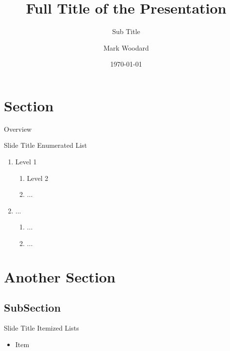 \usepackage[english] {babel}

\usepackage{amsmath, amsfonts, graphicx}
\usepackage{bibunits, tikz}


\title[Short Title]{Full Title of the Presentation}
\subtitle{Sub Title}
\author[Bruce Wayne]{Mark Woodard}
\date{\today}


\maketitle

\section{Section}
\begin{frame}{Overview}
  \tableofcontents
\end{frame}

\begin{frame}{Slide Title}
  Enumerated List~\cite{ipsum}\pause
  \begin{enumerate}
  \item Level 1
    \begin{enumerate}
    \item Level 2
    \item ...
    \end{enumerate}\pause
  \item ...
    \begin{enumerate}
    \item ...
    \item ...
    \end{enumerate}
  \end{enumerate}
\end{frame}

\section{Another Section}
\subsection{SubSection}
\begin{frame}{Slide Title}
  Itemized Lists~\cite{lorem}
  \begin{itemize}
  \item Item
  \end{itemize}
\end{frame}


